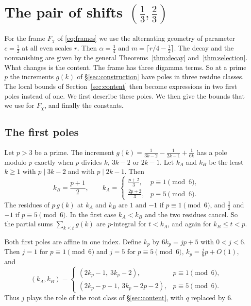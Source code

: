 \section{The pair of shifts \texorpdfstring{$(\frac13,\frac23)$}{(1/3,2/3)}}
\label{sec:chi3-quarter}

For the frame $F_\chi$ of \eqref{eq:frames} we use the alternating geometry of parameter $c=\frac12$ at all even scales
$r$. Then $\alpha=\frac14$ and $m=\lceil r/4-\frac12\rceil$. The decay and the nonvanishing are given by the general
Theorems~\ref{thm:decay} and~\ref{thm:selection}. What changes is the content. The frame has three digamma terms. So at a
prime $p$ the increments $g(k)$ of \S\ref{sec:construction} have poles in three residue classes. The local bounds of
Section~\ref{sec:content} then become expressions in two first poles instead of one. We first describe these poles. We
then give the bounds that we use for $F_\chi$, and finally the constants.

\subsection{The first poles}
Let $p>3$ be a prime. The increment $g(k)=\frac1{3k-2}-\frac1{2k-1}+\frac1{6k}$ has a pole modulo $p$ exactly when $p$
divides $k$, $3k-2$ or $2k-1$. Let $k_A$ and $k_B$ be the least $k\ge1$ with $p\mid3k-2$ and with $p\mid2k-1$. Then
\[
 k_B=\frac{p+1}2,\qquad
 k_A=\begin{cases}\frac{p+2}3,&p\equiv1\pmod6,\\[3pt]\frac{2p+2}3,&p\equiv5\pmod6.\end{cases}
\]
The residues of $p\,g(k)$ at $k_A$ and $k_B$ are $1$ and $-1$ if $p\equiv1\pmod6$, and $\frac12$ and $-1$ if
$p\equiv5\pmod6$. In the first case $k_A<k_B$ and the two residues cancel. So the partial sums $\sum_{k\le t}g(k)$ are
$p$-integral for $t<k_A$, and again for $k_B\le t<p$.

Both first poles are affine in one index. Define $k_p$ by $6k_p=jp+5$ with $0<j<6$. Then $j=1$ for $p\equiv1\pmod6$ and
$j=5$ for $p\equiv5\pmod6$, $k_p=\frac j6p+O(1)$, and
\[
 (k_A,k_B)=\begin{cases}(2k_p-1,\ 3k_p-2),&p\equiv1\pmod6,\\[2pt](2k_p-p-1,\ 3k_p-2p-2),&p\equiv5\pmod6.\end{cases}
\]
Thus $j$ plays the role of the root class of \S\ref{sec:content}, with $q$ replaced by $6$.

